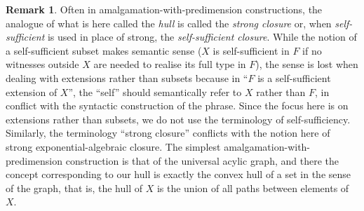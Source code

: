 \documentclass[12pt]{amsart}
\theoremstyle{definition}
\newtheorem{remark}[prop]{Remark}
\begin{document}
\begin{remark}
Often in amalgamation-with-predimension constructions, the analogue of what is here called the \emph{hull} is called the \emph{strong closure} or, when \emph{self-sufficient} is used in place of strong, the \emph{self-sufficient closure}. While the notion of a self-sufficient subset makes semantic sense ($X$ is self-sufficient in $F$ if no witnesses outside $X$ are needed to realise its full type in $F$), the sense is lost when dealing with extensions rather than subsets because in ``$F$ is a self-sufficient extension of $X$'', the ``self'' should semantically refer to $X$ rather than $F$, in conflict with the syntactic construction of the phrase. Since the focus here is on extensions rather than subsets, we do not use the terminology of self-sufficiency. Similarly, the terminology ``strong closure'' conflicts with the notion here of strong exponential-algebraic closure. The simplest amalgamation-with-predimension construction is that of the universal acylic graph, and there the concept corresponding to our hull is exactly the convex hull of a set in the sense of the graph, that is, the hull of $X$ is the union of all paths between elements of $X$. 
\end{remark}
\end{document}
